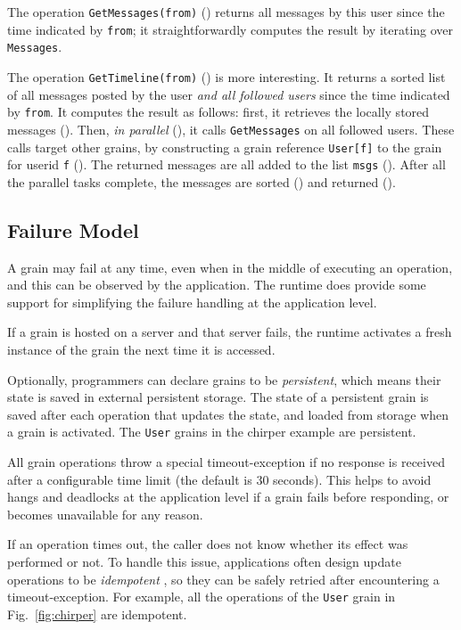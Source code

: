 The operation \lstinline|GetMessages(from)| () returns all messages by this user since the time indicated by \lstinline|from|; it straightforwardly computes the result by iterating over \lstinline{Messages}.  

The operation  \lstinline|GetTimeline(from)|  () is more interesting. It returns a sorted list of all messages posted by the user \emph{and all followed users} since  the time indicated by \lstinline|from|. It computes the result as follows: first, it retrieves the locally stored messages (). Then, \emph{in parallel} (), it calls \lstinline|GetMessages| on all followed users. These calls target other grains, by constructing a grain reference \lstinline|User[f]| to the grain for userid \lstinline|f| (). The returned messages are all added to the list \lstinline|msgs| (). After all the parallel tasks complete, the messages are sorted () and returned ().

\subsection{Failure Model}

A grain may fail at any time, even when in the middle of executing an operation, and this can be observed by the application. The runtime does provide some support for simplifying the failure handling at the application level. 

 If a grain is hosted on a server and that server fails, the runtime activates a fresh instance of the grain the next time it is accessed. 

 Optionally, programmers can declare grains to be \emph{persistent}, which means their state is saved in external persistent storage. The state of a persistent grain is saved after each operation that updates the state, and loaded from storage when a grain is activated. The \lstinline|User| grains in the chirper example are persistent. 

 All grain operations throw a special timeout-exception if no response is received after a configurable time limit (the default is 30 seconds). This helps to avoid hangs and deadlocks at the application level if a grain fails before responding, or becomes unavailable for any reason.

If an operation times out, the caller does not know whether its effect was performed or not. To handle this issue, applications often design update operations to be \emph{idempotent} \cite{kapil}, so they can be safely retried after encountering a timeout-exception. For example, all the operations of the \lstinline|User| grain in Fig.~\ref{fig:chirper} are idempotent.

